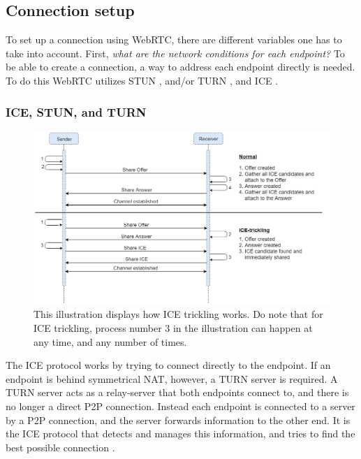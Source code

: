     \subsection{Connection setup}
    \label{sec:conn_setup}
    To set up a connection using WebRTC, there are different variables one has to take into account. First, \emph{what are the network conditions for each endpoint?} To be able to create a connection, a way to address each endpoint directly is needed. To do this WebRTC utilizes STUN \cite{ar_stun}, and/or TURN \cite{ar_turn}, and ICE \cite{ar_ice}. 
    \subsubsection*{ICE, STUN, and TURN}
    \label{sec:webrtc_icetri}
    \begin{figure}[th]
      \centering
      \includegraphics[width=\textwidth]{Figures/ICE_trickling}
      \decoRule
      \caption[ICE trickling]{This illustration displays how ICE trickling works. Do note that for ICE trickling, process number 3 in the illustration can happen at any time, and any number of times.}
      \label{fig:ice_trick}
    \end{figure}
    The ICE protocol works by trying to connect directly to the endpoint. If an endpoint is behind symmetrical NAT, however, a TURN server is required. A TURN server acts as a relay-server that both endpoints connect to, and there is no longer a direct P2P connection. Instead each endpoint is connected to a server by a P2P connection, and the server forwards information to the other end. It is the ICE protocol that detects and manages this information, and tries to find the best possible connection \cite{ar_webrtc_sign}.

